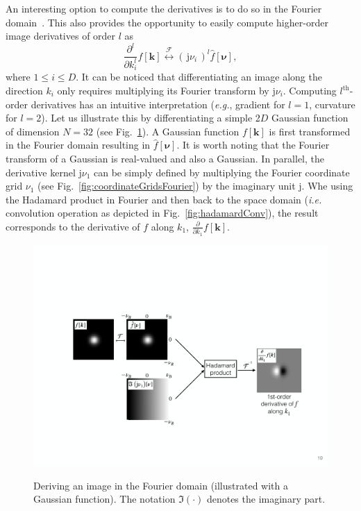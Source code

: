 \documentclass[fleqn,a4paper,oneside,openany]{book}
\begin{document}
An interesting option to compute the derivatives is to do so in the Fourier domain~\cite{DeF2017}.
This also provides the opportunity to easily compute higher-order image derivatives of order $l$ as
%
\begin{equation}\label{eq:FourierDerivative}
\frac{\partial^l}{\partial k_i^l} f[\boldsymbol{k}] \overset{\mathcal{F}}{\longleftrightarrow} (\,\mathrm{j}\nu_i\,)^l \hat{f}[\boldsymbol{\nu}],
\end{equation}
%
where $1\leq i \leq D$.
It can be noticed that differentiating an image along the direction $k_i$ only requires multiplying its Fourier transform by $\mathrm{j}\nu_i$.
Computing $l^{\text{th}}$-order derivatives has an intuitive interpretation (\emph{e.g.}, gradient for $l=1$, curvature for $l=2$).
Let us illustrate this by differentiating a simple 2$D$ Gaussian function of dimension $N=32$ (see Fig.~\ref{fig:GaussianDerivative}).
A Gaussian function $f[\boldsymbol{k}]$ is first transformed in the Fourier domain resulting in $\hat{f}[\boldsymbol{\nu}]$. It is worth noting that the Fourier transform of a Gaussian is real-valued and also a Gaussian.
In parallel, the derivative kernel $\mathrm{j}\nu_1$ can be simply defined by multiplying the Fourier coordinate grid $\nu_1$ (see Fig.~\ref{fig:coordinateGridsFourier}) by the imaginary unit $\mathrm{j}$.
Whe using the Hadamard product in Fourier and then back to the space domain (\emph{i.e.} convolution operation as depicted in Fig.~\ref{fig:hadamardConv}), the result corresponds to the derivative of $f$ along $k_1$, $\frac{\partial}{\partial k_1} f[\boldsymbol{k}]$.
%
\begin{figure}
\centering
\includegraphics[trim = 0 0 0 0, clip, width=1\linewidth]{GaussianDerivative.pdf}\\
\caption{Deriving an image in the Fourier domain (illustrated with a Gaussian function). The notation $\Im(\cdot)$ denotes the imaginary part.}
  \label{fig:GaussianDerivative}
\end{figure}
%
\end{document}
